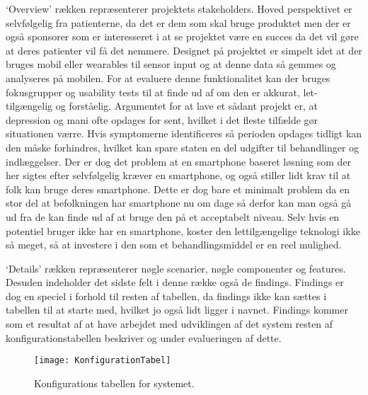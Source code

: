 `Overview' rækken repræsenterer projektets stakeholders. Hoved perspektivet er selvfølgelig fra patienterne, da det er dem som skal bruge produktet men der er også sponsorer som er interesseret i at se projektet være en succes da det vil gøre at deres patienter vil få det nemmere. 
Designet på projektet er simpelt idet at der bruges mobil eller wearables til sensor input og at denne data så gemmes og analyseres på mobilen. 
For at evaluere denne funktionalitet kan der bruges fokusgrupper og usability tests til at finde ud af om den er akkurat, let-tilgængelig og forståelig.
Argumentet for at lave et sådant projekt er, at depression og mani ofte opdages for sent, hvilket i det fleste tilfælde gør situationen værre.
Hvis symptomerne identificeres så perioden opdages tidligt kan den måske forhindres, hvilket kan spare staten en del udgifter til behandlinger og indlæggelser.
Der er dog det problem at en smartphone baseret løsning som der her sigtes efter selvfølgelig kræver en smartphone, og også stiller lidt krav til at folk kan bruge deres smartphone.
Dette er dog bare et minimalt problem da en stor del at befolkningen har smartphone nu om dage så derfor kan man også gå ud fra de kan finde ud af at bruge den på et acceptabelt niveau.
Selv hvis en potentiel bruger ikke har en smartphone, koster den lettilgængelige teknologi ikke så meget, så at investere i den som et behandlingsmiddel er en reel mulighed.

`Details' rækken repræsenterer nøgle scenarier, nøgle componenter og features.
Desuden indeholder det sidste felt i denne række også de findings.
Findings er dog en speciel i forhold til resten af tabellen, da findings ikke kan sættes i tabellen til at starte med, hvilket jo også lidt ligger i navnet.
Findings kommer som et resultat af at have arbejdet med udviklingen af det system resten af konfigurationstabellen beskriver og under evalueringen af dette. 


\begin{figure}
\texttt{[image: KonfigurationTabel]}
\caption{Konfigurations tabellen for systemet.}
\label{tab:konfigurationsTabel}
\end{figure}
